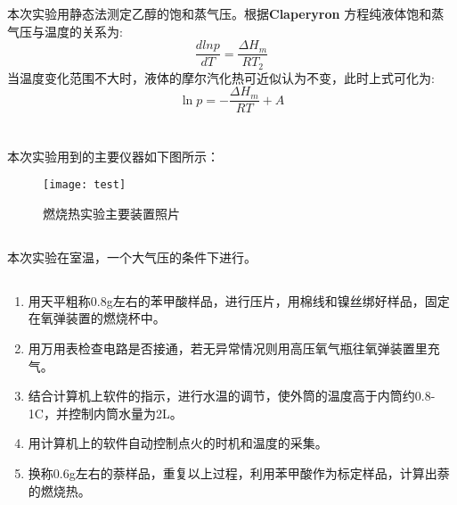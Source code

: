 ﻿\documentclass[10.5pt]{article}
\begin{document}
\title{\textbf{}} %
\author{}
\date{}
\maketitle
\section{\textbf{}}
本次实验用静态法测定乙醇的饱和蒸气压。根据\textbf{Claperyron} 方程纯液体饱和蒸气压与温度的关系为:
\begin{equation}
\frac{d lnp}{dT}=\frac{\Delta H_m}{RT_2}
\end{equation}
当温度变化范围不大时，液体的摩尔汽化热可近似认为不变，此时上式可化为:
\begin{equation}
\ln p=-\frac{\Delta H_m}{RT}+A
\end{equation}

\section{\textbf{}}
\subsection{\textbf{}}
本次实验用到的主要仪器如下图所示：
\begin{figure}[!ht]
\centering
\caption{燃烧热实验主要装置照片}
\texttt{[image: test]}
\end{figure}




\subsection{\textbf{}}
本次实验在室温，一个大气压的条件下进行。
\subsection{\textbf{}}
\begin{enumerate}
\item 用天平粗称0.8g左右的苯甲酸样品，进行压片，用棉线和镍丝绑好样品，固定在氧弹装置的燃烧杯中。
\item 用万用表检查电路是否接通，若无异常情况则用高压氧气瓶往氧弹装置里充气。
\item 结合计算机上软件的指示，进行水温的调节，使外筒的温度高于内筒约0.8-1\degree C，并控制内筒水量为2L。
\item 用计算机上的软件自动控制点火的时机和温度的采集。
\item 换称0.6g左右的萘样品，重复以上过程，利用苯甲酸作为标定样品，计算出萘的燃烧热。
\end{enumerate}
\end{document}
